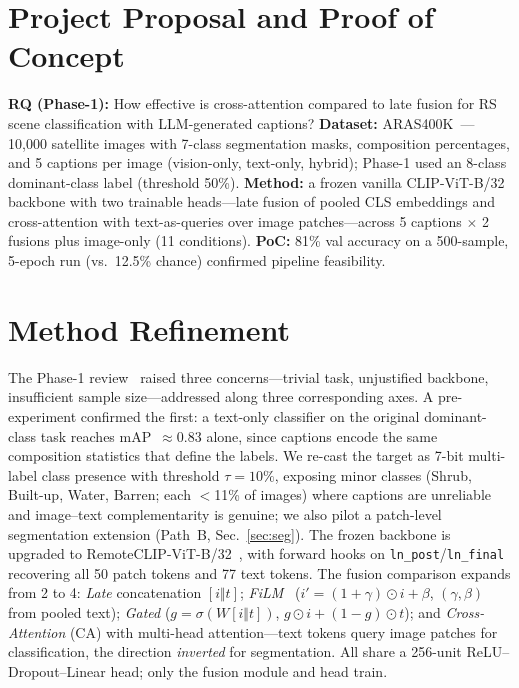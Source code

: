 \documentclass[conference]{IEEEtran}
\begin{document}
\section{Project Proposal and Proof of Concept}

\textbf{RQ (Phase-1):} How effective is cross-attention compared to late fusion for RS scene classification with LLM-generated captions? \textbf{Dataset:} ARAS400K~\cite{caglar2026aras400k}---10{,}000 satellite images with 7-class segmentation masks, composition percentages, and 5 captions per image (vision-only, text-only, hybrid); Phase-1 used an 8-class dominant-class label (threshold 50\%). \textbf{Method:} a frozen vanilla CLIP-ViT-B/32 backbone with two trainable heads---late fusion of pooled CLS embeddings and cross-attention with text-as-queries over image patches---across 5 captions $\times$ 2 fusions plus image-only (11 conditions). \textbf{PoC:} 81\% val accuracy on a 500-sample, 5-epoch run (vs.\ 12.5\% chance) confirmed pipeline feasibility.


\section{Method Refinement}

The Phase-1 review~\cite{phase1feedback} raised three concerns---trivial task, unjustified backbone, insufficient sample size---addressed along three corresponding axes. A pre-experiment confirmed the first: a text-only classifier on the original dominant-class task reaches mAP~$\approx 0.83$ alone, since captions encode the same composition statistics that define the labels. We re-cast the target as 7-bit multi-label class presence with threshold $\tau{=}10\%$, exposing minor classes (Shrub, Built-up, Water, Barren; each $<$11\% of images) where captions are unreliable and image--text complementarity is genuine; we also pilot a patch-level segmentation extension (Path~B, Sec.~\ref{sec:seg}). The frozen backbone is upgraded to RemoteCLIP-ViT-B/32~\cite{liu2024remoteclip}, with forward hooks on \texttt{ln\_post}/\texttt{ln\_final} recovering all 50 patch tokens and 77 text tokens. The fusion comparison expands from 2 to 4: \emph{Late} concatenation $[i\Vert t]$; \emph{FiLM}~\cite{perez2018film} ($i'{=}(1{+}\gamma)\odot i + \beta$, $(\gamma,\beta)$ from pooled text); \emph{Gated} ($g{=}\sigma(W[i\Vert t])$, $g\odot i+(1{-}g)\odot t$); and \emph{Cross-Attention} (CA) with multi-head attention---text tokens query image patches for classification, the direction \emph{inverted} for segmentation. All share a 256-unit ReLU--Dropout--Linear head; only the fusion module and head train.
\end{document}
